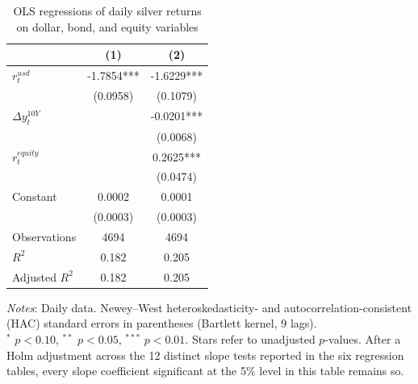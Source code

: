 \begin{table}[H]
\centering
\caption{OLS regressions of daily silver returns on dollar, bond, and equity variables}
\label{tab:ols_silver_dollar}
\begin{tabular}{lcc}
\toprule
 & (1) & (2) \\
\midrule
$r^{usd}_t$ & -1.7854*** & -1.6229*** \\
 & (0.0958) & (0.1079) \\
$\Delta y^{10Y}_t$ &  & -0.0201*** \\
 &  & (0.0068) \\
$r^{equity}_t$ &  & 0.2625*** \\
 &  & (0.0474) \\
Constant & 0.0002 & 0.0001 \\
 & (0.0003) & (0.0003) \\
Observations & 4694 & 4694 \\
$R^2$ & 0.182 & 0.205 \\
Adjusted $R^2$ & 0.182 & 0.205 \\
\bottomrule
\end{tabular}

\vspace{0.2cm}
\begin{minipage}{0.9\textwidth}
\footnotesize
\textit{Notes}: Daily data. Newey--West heteroskedasticity- and autocorrelation-consistent (HAC) standard errors in parentheses (Bartlett kernel, 9 lags).\\
$^*$ $p<0.10$, $^{**}$ $p<0.05$, $^{***}$ $p<0.01$. Stars refer to unadjusted $p$-values. After a Holm adjustment across the 12 distinct slope tests reported in the six regression tables, every slope coefficient significant at the 5\% level in this table remains so.
\end{minipage}
\end{table}
